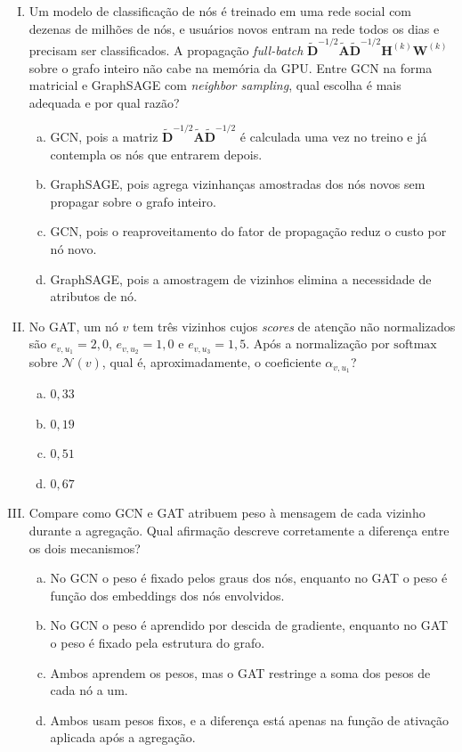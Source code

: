 \documentclass{dlproblemset}
\begin{document}
\begin{enumerate}[I)]
    \item Um modelo de classificação de nós é treinado em uma rede social com dezenas de milhões de nós, e usuários novos entram na rede todos os dias e precisam ser classificados. A propagação \textit{full-batch} $\tilde{\mathbf{D}}^{-1/2} \tilde{\mathbf{A}} \tilde{\mathbf{D}}^{-1/2} \mathbf{H}^{(k)} \mathbf{W}^{(k)}$ sobre o grafo inteiro não cabe na memória da GPU. Entre GCN na forma matricial e GraphSAGE com \textit{neighbor sampling}, qual escolha é mais adequada e por qual razão?
    \begin{enumerate}[(a)]
        \item GCN, pois a matriz $\tilde{\mathbf{D}}^{-1/2} \tilde{\mathbf{A}} \tilde{\mathbf{D}}^{-1/2}$ é calculada uma vez no treino e já contempla os nós que entrarem depois.
        \item GraphSAGE, pois agrega vizinhanças amostradas dos nós novos sem propagar sobre o grafo inteiro.
        \item GCN, pois o reaproveitamento do fator de propagação reduz o custo por nó novo.
        \item GraphSAGE, pois a amostragem de vizinhos elimina a necessidade de atributos de nó.
    \end{enumerate}

    \item No GAT, um nó $v$ tem três vizinhos cujos \textit{scores} de atenção não normalizados são $e_{v,u_1} = 2{,}0$, $e_{v,u_2} = 1{,}0$ e $e_{v,u_3} = 1{,}5$. Após a normalização por $\mathrm{softmax}$ sobre $\mathcal{N}(v)$, qual é, aproximadamente, o coeficiente $\alpha_{v,u_1}$?
    \begin{enumerate}[(a)]
        \item $0{,}33$
        \item $0{,}19$
        \item $0{,}51$
        \item $0{,}67$
    \end{enumerate}

    \item Compare como GCN e GAT atribuem peso à mensagem de cada vizinho durante a agregação. Qual afirmação descreve corretamente a diferença entre os dois mecanismos?
    \begin{enumerate}[(a)]
        \item No GCN o peso é fixado pelos graus dos nós, enquanto no GAT o peso é função dos embeddings dos nós envolvidos.
        \item No GCN o peso é aprendido por descida de gradiente, enquanto no GAT o peso é fixado pela estrutura do grafo.
        \item Ambos aprendem os pesos, mas o GAT restringe a soma dos pesos de cada nó a um.
        \item Ambos usam pesos fixos, e a diferença está apenas na função de ativação aplicada após a agregação.
    \end{enumerate}


\end{enumerate}
\end{document}
